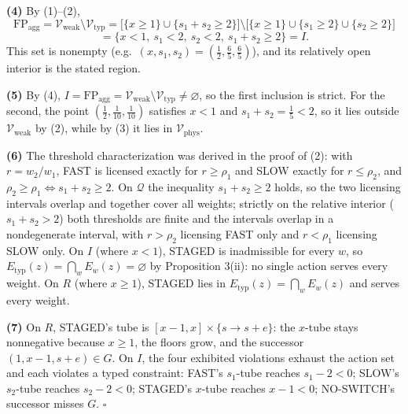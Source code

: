 \documentclass[3p,11pt]{elsarticle}
\begin{document}
\textbf{(4)} By (1)--(2),
\[\mathrm{FP}_{\mathrm{agg}} = \mathcal{V}_{\mathrm{weak}} \setminus \mathcal{V}_{\mathrm{typ}}
= \big[ \{x \ge 1\} \cup \{s_1 + s_2 \ge 2\} \big] \setminus \big[ \{x \ge 1\} \cup \{s_1 \ge 2\} \cup \{s_2 \ge 2\} \big]\]
\[= \{ x < 1,\ s_1 < 2,\ s_2 < 2,\ s_1 + s_2 \ge 2 \} = I.\]
This set is nonempty
(e.g.~\((x, s_1, s_2) = (\tfrac12, \tfrac65, \tfrac65)\)), and its
relatively open interior is the stated region.

\textbf{(5)} By (4),
\(I = \mathrm{FP}_{\mathrm{agg}} = \mathcal{V}_{\mathrm{weak}} \setminus \mathcal{V}_{\mathrm{typ}} \neq \varnothing\),
so the first inclusion is strict. For the second, the point
\((\tfrac12, \tfrac1{10}, \tfrac1{10})\) satisfies \(x < 1\) and
\(s_1 + s_2 = \tfrac15 < 2\), so it lies outside
\(\mathcal{V}_{\mathrm{weak}}\) by (2), while by (3) it lies in
\(\mathcal{V}_{\mathrm{phys}}\).

\textbf{(6)} The threshold characterization was derived in the proof of
(2): with \(r = w_2 / w_1\), FAST is licensed exactly for
\(r \ge \rho_1\) and SLOW exactly for \(r \le \rho_2\), and
\(\rho_2 \ge \rho_1 \iff s_1 + s_2 \ge 2\). On \(\mathcal{Q}\) the
inequality \(s_1 + s_2 \ge 2\) holds, so the two licensing intervals
overlap and together cover all weights; strictly on the relative
interior (\(s_1 + s_2 > 2\)) both thresholds are finite and the
intervals overlap in a nondegenerate interval, with \(r > \rho_2\)
licensing FAST only and \(r < \rho_1\) licensing SLOW only. On \(I\)
(where \(x < 1\)), STAGED is inadmissible for every \(w\), so
\(E_{\mathrm{typ}}(z) = \bigcap_w E_w(z) = \varnothing\) by Proposition
3(ii): no single action serves every weight. On \(R\) (where
\(x \ge 1\)), STAGED lies in \(E_{\mathrm{typ}}(z) = \bigcap_w E_w(z)\)
and serves every weight.

\textbf{(7)} On \(R\), STAGED's tube is
\([x - 1, x] \times \{s \to s + e\}\): the \(x\)-tube stays nonnegative
because \(x \ge 1\), the floors grow, and the successor
\((1, x - 1, s + e) \in G\). On \(I\), the four exhibited violations
exhaust the action set and each violates a typed constraint: FAST's
\(s_1\)-tube reaches \(s_1 - 2 < 0\); SLOW's \(s_2\)-tube reaches
\(s_2 - 2 < 0\); STAGED's \(x\)-tube reaches \(x - 1 < 0\); NO-SWITCH's
successor misses \(G\). \ensuremath{\square}
\end{document}
